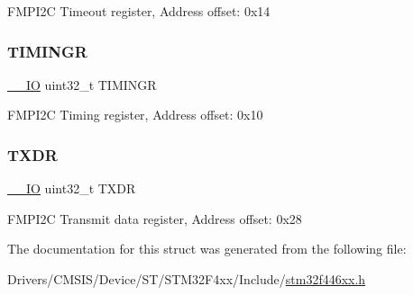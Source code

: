F\+M\+P\+I2C Timeout register, Address offset\+: 0x14 \mbox{\label{struct_f_m_p_i2_c___type_def_a5576a30ffbe0a0800ce7788610327677}} 
\subsubsection{\texorpdfstring{T\+I\+M\+I\+N\+GR}{TIMINGR}}
{\footnotesize\ttfamily \mbox{\hyperlink{core__sc300_8h_aec43007d9998a0a0e01faede4133d6be}{\+\_\+\+\_\+\+IO}} uint32\+\_\+t T\+I\+M\+I\+N\+GR}

F\+M\+P\+I2C Timing register, Address offset\+: 0x10 \mbox{\label{struct_f_m_p_i2_c___type_def_ad7e8d785fff2acfeb8814e43bda8dd72}} 
\subsubsection{\texorpdfstring{T\+X\+DR}{TXDR}}
{\footnotesize\ttfamily \mbox{\hyperlink{core__sc300_8h_aec43007d9998a0a0e01faede4133d6be}{\+\_\+\+\_\+\+IO}} uint32\+\_\+t T\+X\+DR}

F\+M\+P\+I2C Transmit data register, Address offset\+: 0x28 

The documentation for this struct was generated from the following file\+:\begin{DoxyCompactItemize}
\item 
Drivers/\+C\+M\+S\+I\+S/\+Device/\+S\+T/\+S\+T\+M32\+F4xx/\+Include/\mbox{\hyperlink{stm32f446xx_8h}{stm32f446xx.\+h}}\end{DoxyCompactItemize}
